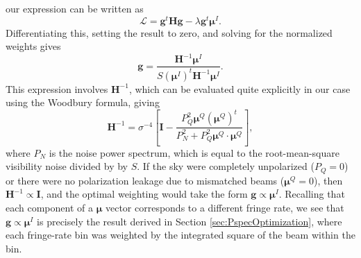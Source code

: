 \documentclass[twocolumn,apj,numberedappendix]{emulateapj}
\begin{document}
our expression can be written as
\begin{equation}
\mathcal L = \mathbf{g}^t \mathbf{H} \mathbf{g} - \lambda \mathbf{g}^t \boldsymbol \mu^I.
\end{equation}
Differentiating this, setting the result to zero, and solving for the normalized weights gives
\begin{equation}
\label{eq:PolOptWeights}
\mathbf{g} =  \frac{\mathbf{H}^{-1}  \boldsymbol \mu^I}{ S (\boldsymbol \mu^I)^t  \mathbf{H}^{-1}  \boldsymbol \mu^I}.
\end{equation}
This expression involves $\mathbf{H}^{-1}$, which can be evaluated quite explicitly in our case using the
Woodbury formula, giving
\begin{equation}
\label{eq:Hinv}
\mathbf{H}^{-1} = \sigma^{-4} \left[ \mathbf{I} - \frac{P_Q^2\boldsymbol \mu^Q (\boldsymbol \mu^Q)^t }{P_N^2 + P_Q^2 \boldsymbol \mu^Q \cdot \boldsymbol \mu^Q} \right],
\end{equation}
where $P_N$ is the noise power spectrum, which is equal to the root-mean-square visibility
noise divided by by $S$. If the sky were completely unpolarized ($P_Q = 0$) or there were no polarization leakage due to mismatched beams ($\boldsymbol \mu^Q = 0$), then $\mathbf{H}^{-1} \propto \mathbf{I}$, and the optimal weighting would take the form
$\mathbf{g} \propto \boldsymbol \mu^I$. Recalling that each component of a $\boldsymbol \mu$ vector corresponds
to a different fringe rate, we see that $\mathbf{g} \propto \boldsymbol \mu^I$ is precisely the result derived in Section
\ref{sec:PspecOptimization}, where each fringe-rate bin was weighted by the integrated square of the beam within the bin.
\end{document}
